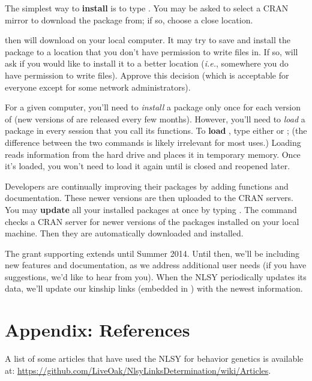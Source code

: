 \documentclass{article}\usepackage[]{graphicx}\usepackage[]{color}
\begin{document}
The simplest way to \textbf{install}  is to type
.  You may be asked to select a CRAN
mirror to download the package from; if so, choose a close location.

\R{} then will download  on your local computer.  It may
try to save and install the package to a location that you don't have permission to
write files in.  If so, \R{} will ask if you would like to install it to a
better location (\emph{i.e.}, somewhere you do have permission to write files). 
Approve this decision (which is acceptable for everyone except for some network
administrators).

For a given computer, you'll need to \emph{install} a package only once for each
version of \R{} (new versions of \R{} are released every few months).  However, you'll need to \emph{load} a package in
every session that you call its functions.  To \textbf{load} ,
type either  or ; (the
difference between the two commands is likely irrelevant for most uses.) 
Loading reads  information from the hard drive and places it in
temporary memory.  Once it's loaded, you won't need to load it again until \R{}
is closed and reopened later.

Developers are continually improving their packages by adding functions and
documentation.  These newer versions are then uploaded to the CRAN servers.  You
may \textbf{update} all your installed packages at once by typing
.  The command checks a CRAN server for
newer versions of the packages installed on your local machine.  Then they are
automatically downloaded and installed. 

The grant supporting  extends until Summer 2014.  Until then,
we'll be including new features and documentation, as we address additional user
needs (if you have suggestions, we'd like to hear from you).  When the NLSY periodically updates its data, we'll
update our kinship links (embedded in ) with the newest information.


\section{Appendix: References} \label{sec:References}
A list of some articles that have used the NLSY for behavior genetics is available at: \url{https://github.com/LiveOak/NlsyLinksDetermination/wiki/Articles}.
\end{document}
